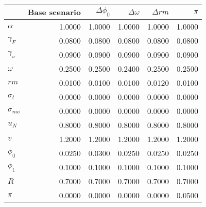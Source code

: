 \begin{tabular}{lrrrrr}
\toprule
{} &  Base scenario &  $\Delta \phi_0$ &  $\Delta \omega$ &  $\Delta rm$ &  $\pi$ \\
\midrule
$\alpha$      &         1.0000 &           1.0000 &           1.0000 &       1.0000 & 1.0000 \\
$\gamma_F$    &         0.0800 &           0.0800 &           0.0800 &       0.0800 & 0.0800 \\
$\gamma_u$    &         0.0900 &           0.0900 &           0.0900 &       0.0900 & 0.0900 \\
$\omega$      &         0.2500 &           0.2500 &           0.2400 &       0.2500 & 0.2500 \\
$rm$          &         0.0100 &           0.0100 &           0.0100 &       0.0120 & 0.0100 \\
$\sigma_{l}$  &         0.0000 &           0.0000 &           0.0000 &       0.0000 & 0.0000 \\
$\sigma_{mo}$ &         0.0000 &           0.0000 &           0.0000 &       0.0000 & 0.0000 \\
$u_N$         &         0.8000 &           0.8000 &           0.8000 &       0.8000 & 0.8000 \\
$v$           &         1.2000 &           1.2000 &           1.2000 &       1.2000 & 1.2000 \\
$\phi_0$      &         0.0250 &           0.0300 &           0.0250 &       0.0250 & 0.0250 \\
$\phi_1$      &         0.1000 &           0.1000 &           0.1000 &       0.1000 & 0.1000 \\
$R$           &         0.7000 &           0.7000 &           0.7000 &       0.7000 & 0.7000 \\
$\pi$         &         0.0000 &           0.0000 &           0.0000 &       0.0000 & 0.0500 \\
\bottomrule
\end{tabular}
